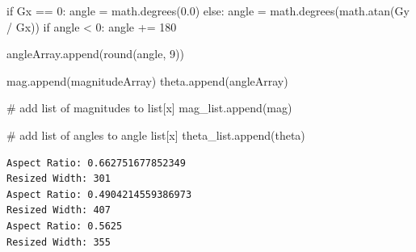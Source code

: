 \documentclass[
  letterpaper,
  DIV=11,
  numbers=noendperiod]{scrreprt}
\newenvironment{Shaded}{\begin{snugshade}}{\end{snugshade}}
\newcommand{\BuiltInTok}[1]{\textcolor[rgb]{0.00,0.23,0.31}{#1}}
\newcommand{\CommentTok}[1]{\textcolor[rgb]{0.37,0.37,0.37}{#1}}
\newcommand{\ControlFlowTok}[1]{\textcolor[rgb]{0.00,0.23,0.31}{#1}}
\newcommand{\DecValTok}[1]{\textcolor[rgb]{0.68,0.00,0.00}{#1}}
\newcommand{\FloatTok}[1]{\textcolor[rgb]{0.68,0.00,0.00}{#1}}
\newcommand{\NormalTok}[1]{\textcolor[rgb]{0.00,0.23,0.31}{#1}}
\newcommand{\OperatorTok}[1]{\textcolor[rgb]{0.37,0.37,0.37}{#1}}
\begin{document}
\begin{Shaded}
\begin{Highlighting}[]
            \ControlFlowTok{if}\NormalTok{ Gx }\OperatorTok{==} \DecValTok{0}\NormalTok{:}
\NormalTok{                angle }\OperatorTok{=}\NormalTok{ math.degrees(}\FloatTok{0.0}\NormalTok{)}
            \ControlFlowTok{else}\NormalTok{:}
\NormalTok{                angle }\OperatorTok{=}\NormalTok{ math.degrees(math.atan(Gy }\OperatorTok{/}\NormalTok{ Gx))}
                \ControlFlowTok{if}\NormalTok{ angle }\OperatorTok{\textless{}} \DecValTok{0}\NormalTok{:}
\NormalTok{                    angle }\OperatorTok{+=} \DecValTok{180}

\NormalTok{            angleArray.append(}\BuiltInTok{round}\NormalTok{(angle, }\DecValTok{9}\NormalTok{))}

\NormalTok{        mag.append(magnitudeArray)}
\NormalTok{        theta.append(angleArray)}

    \CommentTok{\# add list of magnitudes to list[x]}
\NormalTok{    mag\_list.append(mag)}

    \CommentTok{\# add list of angles to angle list[x]}
\NormalTok{    theta\_list.append(theta)}
\end{Highlighting}
\end{Shaded}

\begin{verbatim}
Aspect Ratio: 0.662751677852349
Resized Width: 301
Aspect Ratio: 0.4904214559386973
Resized Width: 407
Aspect Ratio: 0.5625
Resized Width: 355
\end{verbatim}
\end{document}
